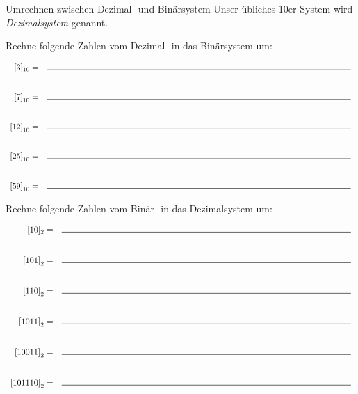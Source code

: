 \documentclass{uebungszettel}
\begin{document}
\begin{aufgabe}{Umrechnen zwischen Dezimal- und Binärsystem}
Unser übliches 10er-System wird \emph{Dezimalsystem} genannt.

Rechne folgende Zahlen vom Dezimal- in das Binärsystem um:

\[\begin{array}{rr}
[3]_{10} = & \rule{13cm}{0.5px} %
\\\\\\
\left[ 7 \right]_{10} = & \rule{13cm}{0.5px}\\
\\\\
\left[ 12 \right]_{10} = & \rule{13cm}{0.5px}\\
\\\\
\left[ 25 \right]_{10} = & \rule{13cm}{0.5px}\\
\\\\
\left[ 59 \right]_{10} = & \rule{13cm}{0.5px}\\
\end{array}\]

\vspace{1 cm}
Rechne folgende Zahlen vom Binär- in das Dezimalsystem um:

\[\begin{array}{rr}
[10]_{2} = & \rule{12cm}{0.5px}%
\\\\\\
\left[ 101 \right]_{2} = & \rule{12cm}{0.5px}\\
\\\\
\left[ 110 \right]_{2} = & \rule{12cm}{0.5px}\\
\\\\
\left[ 1011 \right]_{2} = & \rule{12cm}{0.5px}\\
\\\\
\left[ 10011 \right]_{2} = & \rule{12cm}{0.5px}\\
\\\\
\left[ 101110 \right]_{2} = & \rule{12cm}{0.5px}\\
\end{array}\]
\end{aufgabe}
\end{document}
